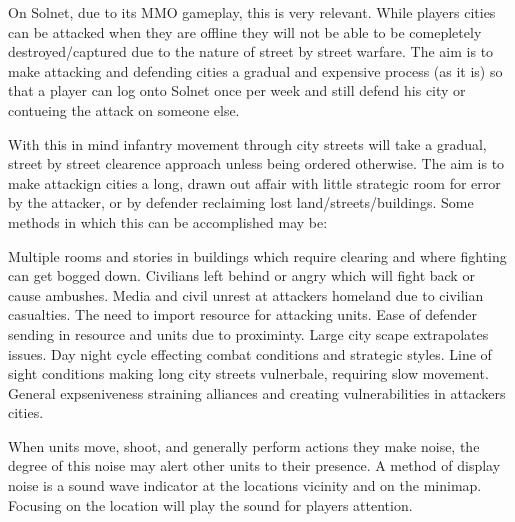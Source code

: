 On Solnet, due to its MMO gameplay, this is very relevant. While players cities can be attacked when they are offline they will not be able to be comepletely destroyed/captured due to the nature of street by street warfare. The aim is to make attacking and defending cities a gradual and expensive process (as it is) so that a player can log onto Solnet once per week and still defend his city or contueing the attack on someone else. 

With this in mind infantry movement through city streets will take a gradual, street by street clearence approach unless being ordered otherwise. The aim is to make attackign cities a long, drawn out affair with little strategic room for error by the attacker, or by defender reclaiming lost land/streets/buildings. Some methods in which this can be accomplished may be:
 
Multiple rooms and stories in buildings which require clearing and where fighting can get bogged down.
 Civilians left behind or angry which will fight back or cause ambushes.
 Media and civil unrest at attackers homeland due to civilian casualties.
 The need to import resource for attacking units.
 Ease of defender sending in resource and units due to proximinty.
 Large city scape extrapolates issues. 
 Day night cycle effecting combat conditions and strategic styles.
 Line of sight conditions making long city streets vulnerbale, requiring slow movement.
 General expseniveness straining alliances and creating vulnerabilities in attackers cities. 





When units move, shoot, and generally perform actions they make noise, the degree of this noise may alert other units to their presence. A method of display noise is a sound wave indicator at the locations vicinity and on the minimap. Focusing on the location will play the sound for players attention.
